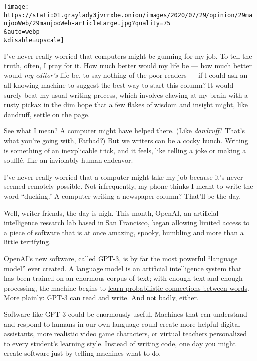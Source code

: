 \texttt{[image: https://static01.graylady3jvrrxbe.onion/images/2020/07/29/opinion/29manjooWeb/29manjooWeb-articleLarge.jpg?quality=75\\\&auto=webp\\\&disable=upscale]}

I've never really worried that computers might be gunning for my job. To
tell the truth, often, I pray for it. How much better would my life be
--- how much better would \emph{my editor's} life be, to say nothing of
the poor readers --- if I could ask an all-knowing machine to suggest
the best way to start this column? It would surely beat my usual writing
process, which involves clawing at my brain with a rusty pickax in the
dim hope that a few flakes of wisdom and insight might, like dandruff,
settle on the page.

See what I mean? A computer might have helped there. (Like
\emph{dandruff}? That's what you're going with, Farhad?) But we writers
can be a cocky bunch. Writing is something of an inexplicable trick, and
it feels, like telling a joke or making a soufflé, like an inviolably
human endeavor.

I've never really worried that a computer might take my job because it's
never seemed remotely possible. Not infrequently, my phone thinks I
meant to write the word ``ducking.'' A computer writing a newspaper
column? That'll be the day.

Well, writer friends, the day is nigh. This month, OpenAI, an
artificial-intelligence research lab based in San Francisco, began
allowing limited access to a piece of software that is at once amazing,
spooky, humbling and more than a little terrifying.

OpenAI's new software, called
\href{https://openai.com/blog/openai-api/}{GPT-3}, is by far the
\href{https://towardsdatascience.com/gpt-3-the-new-mighty-language-model-from-openai-a74ff35346fc}{most
powerful ``language model'' ever created}. A language model is an
artificial intelligence system that has been trained on an enormous
corpus of text; with enough text and enough processing, the machine
begins to
\href{https://www.analyticsvidhya.com/blog/2019/08/comprehensive-guide-language-model-nlp-python-code/}{learn
probabilistic connections between words}. More plainly: GPT-3 can read
and write. And not badly, either.

Software like GPT-3 could be enormously useful. Machines that can
understand and respond to humans in our own language could create more
helpful digital assistants, more realistic video game characters, or
virtual teachers personalized to every student's learning style. Instead
of writing code, one day you might create software just by telling
machines what to do.

